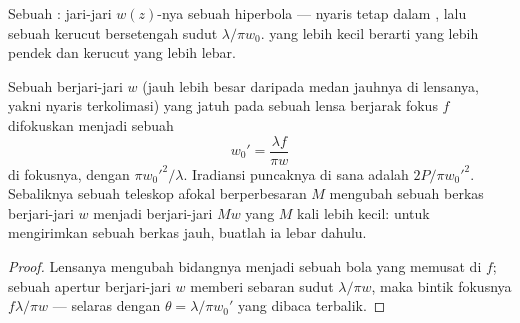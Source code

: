\begin{omfigure}

{\small Sebuah : jari-jari $w(z)$-nya sebuah hiperbola --- nyaris
tetap dalam , lalu sebuah kerucut bersetengah sudut
$\lambda/\pi w_0$.  yang lebih kecil berarti  yang lebih pendek dan
kerucut yang lebih lebar.}
\end{omfigure}

\begin{proposition}\label{prop:b2:laser:focus}
Sebuah  berjari-jari $w$ (jauh lebih besar daripada medan jauhnya
di lensanya, yakni nyaris terkolimasi) yang jatuh pada sebuah lensa berjarak
fokus $f$ difokuskan menjadi sebuah 
\[
w_0' = \frac{\lambda f}{\pi w}
\]
di fokusnya, dengan  $\pi w_0'^2/\lambda$. Iradiansi
puncaknya di sana adalah $2P/\pi w_0'^2$. Sebaliknya sebuah teleskop afokal
berperbesaran $M$ mengubah sebuah berkas berjari-jari $w$ menjadi berjari-jari $Mw$
yang  $M$ kali lebih kecil: untuk mengirimkan sebuah berkas jauh, buatlah ia
lebar dahulu.
\end{proposition}

\begin{proof}
Lensanya mengubah  bidangnya menjadi sebuah bola yang memusat di $f$;
 sebuah apertur berjari-jari $w$ memberi sebaran sudut
$\lambda/\pi w$, maka bintik fokusnya $f\lambda/\pi w$ --- selaras dengan
$\theta = \lambda/\pi w_0'$ yang dibaca terbalik.
\end{proof}

